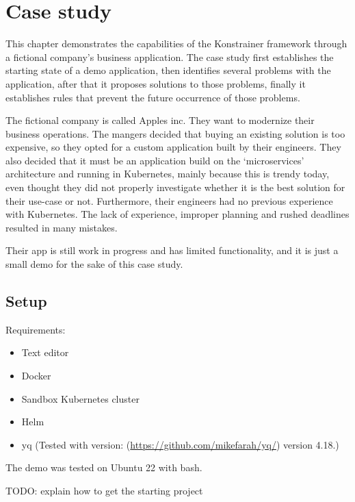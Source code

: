 \chapter{Case study}

This chapter demonstrates the capabilities of the Konstrainer framework through a fictional company's business application. The case study first establishes the starting state of a demo application, then identifies several problems with the application, after that it proposes solutions to those problems, finally it establishes rules that prevent the future occurrence of those problems.

The fictional company is called Apples inc. They want to modernize their business operations. The mangers decided that buying an existing solution is too expensive, so they opted for a custom application built by their engineers. They also decided that it must be an application build on the `microservices' architecture and running in Kubernetes, mainly because this is trendy today, even thought they did not properly investigate whether it is the best solution for their use-case or not. Furthermore, their engineers had no previous experience with Kubernetes. The lack of experience, improper planning and rushed deadlines resulted in many mistakes.

Their app is still work in progress and has limited functionality, and it is just a small demo for the sake of this case study.

\section{Setup}

Requirements:

\begin{itemize}
    \item Text editor
    \item Docker
    \item Sandbox Kubernetes cluster
    \item Helm
    \item yq (Tested with version: (\url{https://github.com/mikefarah/yq/}) version 4.18.)
\end{itemize}

The demo was tested on Ubuntu 22 with bash.

TODO: explain how to get the starting project


